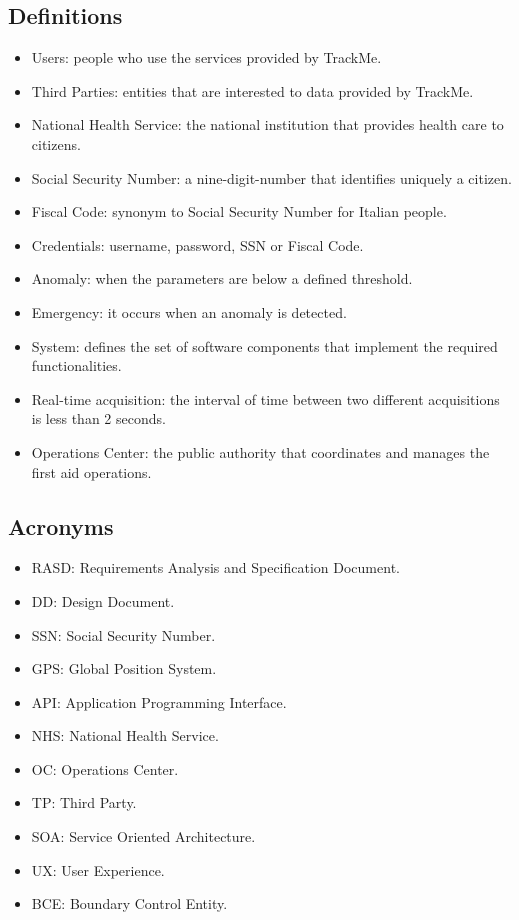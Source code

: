 \subsection{Definitions}
\begin{itemize}
    \item Users: people who use the services provided by TrackMe.
    \item Third Parties: entities that are interested to data provided by TrackMe.
    \item National Health Service: the national institution that provides health care to citizens.
    \item Social Security Number: a nine-digit-number that identifies uniquely a citizen.
    \item Fiscal Code: synonym to Social Security Number for Italian people.
    \item Credentials: username, password, SSN or Fiscal Code.
    \item Anomaly: when the parameters are below a defined threshold. 
    \item Emergency: it occurs when an anomaly is detected.
    \item System: defines the set of software components that implement the required functionalities.
    \item Real-time acquisition: the interval of time between two different acquisitions is less than 2 seconds.
    \item Operations Center: the public authority that coordinates and manages the first aid operations.
\end{itemize}

\subsection{Acronyms}
\begin{itemize}
    \item RASD: Requirements Analysis and Specification Document. 
    \item DD: Design Document.
    \item SSN: Social Security Number.
    \item GPS: Global Position System.
    \item API: Application Programming Interface.
    \item NHS: National Health Service.
    \item OC: Operations Center.
    \item TP: Third Party.
    \item SOA: Service Oriented Architecture.
    \item UX: User Experience.
    \item BCE: Boundary Control Entity.
\end{itemize}

